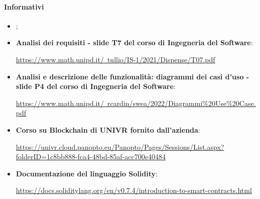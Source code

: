 \paragraph{Informativi}
\begin{itemize}
    \item \textbf{\docNameVersionPdP{}};
    \item \textbf{Analisi dei requisiti - slide T7 del corso di Ingegneria del Software}:
    \begin{center}
        \href{https://www.math.unipd.it/~tullio/IS-1/2021/Dispense/T07.pdf}{https://www.math.unipd.it/~tullio/IS-1/2021/Dispense/T07.pdf}
    \end{center}
    \item \textbf{Analisi e descrizione delle funzionalità: diagrammi dei casi d'uso - slide P4 del corso di Ingegneria del Software}:
    \begin{center}
        \href{https://www.math.unipd.it/~rcardin/swea/2022/Diagrammi%20Use%20Case.pdf}{https://www.math.unipd.it/~rcardin/swea/2022/Diagrammi\%20Use\%20Case.pdf}
    \end{center}
    \item \textbf{Corso su Blockchain di UNIVR fornito dall'azienda}:
    \begin{center}
        \href{https://univr.cloud.panopto.eu/Panopto/Pages/Sessions/List.aspx?folderID=1c8bb888-fca4-48bd-85af-acc700e40484}{https://univr.cloud.panopto.eu/Panopto/Pages/Sessions/List.aspx?folderID=1c8bb888-fca4-48bd-85af-acc700e40484}
    \end{center}
    \item \textbf{Documentazione del linguaggio Solidity\glo{}}:
    \begin{center}
        \href{https://docs.soliditylang.org/en/v0.7.4/introduction-to-smart-contracts.html}{https://docs.soliditylang.org/en/v0.7.4/introduction-to-smart-contracts.html}
    \end{center}
\end{itemize}

\clearpage


